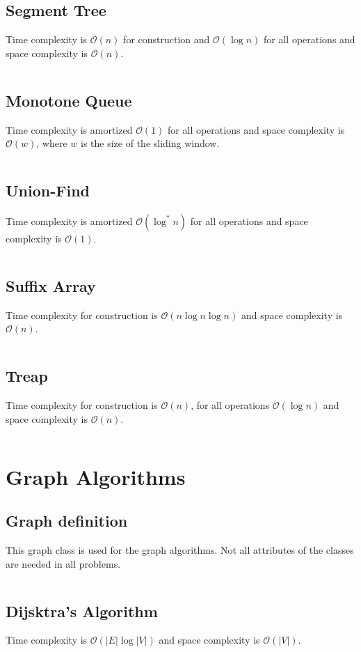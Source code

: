 \documentclass[8pt,a4paper,landscape,oneside]{amsart}
\newcommand{\code}[1]{\inputminted[fontsize=\normalsize,baselinestretch=1]{java}{code/#1}}
\newcommand{\bigO}{\mathcal{O}}
\begin{document}
\begin{multicols*}{3}
  \subsection{Segment Tree}
  Time complexity is $\bigO(n)$ for construction and $\bigO(\log n)$ for all operations and space complexity is $\bigO(n)$.
  \code{Structures/SegmentTreeRMQ.java}
  
  \subsection{Monotone Queue}
  Time complexity is amortized $\bigO(1)$ for all operations and space complexity is $\bigO(w)$, where $w$ is the size of the sliding window.
  \code{Structures/MinMonoQueue.java}
  
  \subsection{Union-Find}
  Time complexity is amortized $\bigO(\log^*{n})$ for all operations and space complexity is $\bigO(1)$.
  \code{Structures/UnionFind.java}
  
  \subsection{Suffix Array}
  Time complexity for construction is $\bigO(n\log{n}\log{n})$ and space complexity is $\bigO(n)$.
  \code{Structures/SuffixArray.java}
  
  \subsection{Treap}
  Time complexity for construction is $\bigO(n)$, for all operations $\bigO(\log{n})$ and space complexity is $\bigO(n)$.
  \code{Structures/Treap.java}
  
  
\section{Graph Algorithms}
  \subsection{Graph definition}
  This graph class is used for the graph algorithms. Not all attributes of the classes are needed in all problems.
  \code{Graphs/Graph.java}
  
  \subsection{Dijsktra's Algorithm}
  Time complexity is $\bigO(|E| \log{|V|})$ and space complexity is $\bigO(|V|)$.
  \code{Graphs/Dijkstras.java}
  

\end{multicols*}
\end{document}

